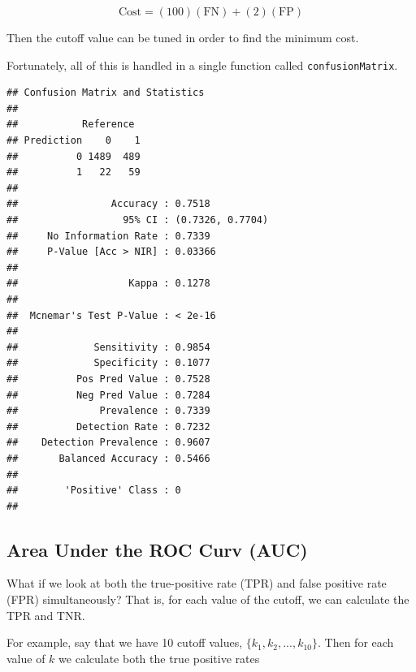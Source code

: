 \documentclass[openany]{book}
\newenvironment{Shaded}{\begin{snugshade}}{\end{snugshade}}
\newcommand{\KeywordTok}[1]{\textcolor[rgb]{0.13,0.29,0.53}{\textbf{#1}}}
\newcommand{\NormalTok}[1]{#1}
\newcommand{\OperatorTok}[1]{\textcolor[rgb]{0.81,0.36,0.00}{\textbf{#1}}}
\begin{document}
\[\text{Cost} = (100)(\text{FN}) + (2)(\text{FP})\]

Then the cutoff value can be tuned in order to find the minimum cost.

Fortunately, all of this is handled in a single function called \texttt{confusionMatrix}.

\begin{Shaded}
\end{Shaded}

\begin{verbatim}
## Confusion Matrix and Statistics
## 
##           Reference
## Prediction    0    1
##          0 1489  489
##          1   22   59
##                                           
##                Accuracy : 0.7518          
##                  95% CI : (0.7326, 0.7704)
##     No Information Rate : 0.7339          
##     P-Value [Acc > NIR] : 0.03366         
##                                           
##                   Kappa : 0.1278          
##                                           
##  Mcnemar's Test P-Value : < 2e-16         
##                                           
##             Sensitivity : 0.9854          
##             Specificity : 0.1077          
##          Pos Pred Value : 0.7528          
##          Neg Pred Value : 0.7284          
##              Prevalence : 0.7339          
##          Detection Rate : 0.7232          
##    Detection Prevalence : 0.9607          
##       Balanced Accuracy : 0.5466          
##                                           
##        'Positive' Class : 0               
## 
\end{verbatim}

\hypertarget{area-under-the-roc-curv-auc}{%
\subsection{Area Under the ROC Curv (AUC)}\label{area-under-the-roc-curv-auc}}

What if we look at both the true-positive rate (TPR) and false positive rate (FPR) simultaneously? That is, for each value of the cutoff, we can calculate the TPR and TNR.

For example, say that we have 10 cutoff values, \(\{k_1, k_2, ..., k_{10}\}\). Then for each value of \(k\) we calculate both the true positive rates
\end{document}
